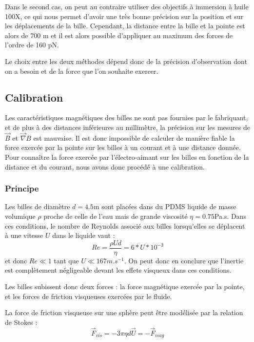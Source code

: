 		 Dans le second cas, on peut au contraire utiliser des objectifs à immersion à huile 100X, ce qui nous permet d'avoir une très bonne précision sur la position et sur les déplacements de la bille. Cependant, la distance entre la bille et la pointe est alors de 700 \micro m et il est alors possible d'appliquer au maximum des forces de l'ordre de 160 pN. 
		 
Le choix entre les deux méthodes dépend donc de la précision d'observation dont on a besoin et de la force que l'on souhaite exercer. 

		 
		 
		 		 
		  
		
		
	\subsection{Calibration}
  
 Les caractéristiques magnétiques des billes ne sont pas fournies par le fabriquant, et de plus à des distances inférieures au millimètre, la précision sur les mesures de $\vec{B}$ et $\vec{\nabla}B$ est mauvaise. 
 Il est donc impossible de calculer de manière fiable la force exercée par la pointe sur les billes à un courant et à une distance donnée.
 Pour connaître la force exercée par l'électro-aimant sur les billes en fonction de la distance et du courant, nous avons donc procédé à une calibration.
 
 \subsubsection{Principe}
 
 Les billes de diamètre $d=4.5$\micro m sont placées dans du PDMS liquide de masse volumique $\rho$ proche de celle de l'eau mais de grande viscosité $\eta=0.75$Pa.s. 
 Dans ces conditions, le nombre de Reynolds associé aux billes lorsqu'elles se déplacent à une vitesse $U$ dans le liquide vaut : $$Re = \frac{\rho U d }{\eta}=6*U*10^{-3}$$
 et donc $Re \ll 1$ tant que  $U \ll 167 m.s^{-1}$. 
 On peut donc en conclure que l'inertie est complètement négligeable devant les effets visqueux dans ces conditions. 
 
 Les billes subissent donc deux forces : la force magnétique exercée par la pointe, et les forces de friction visqueuses exercées par le fluide. 
 
 La force de friction visqueuse sur une sphère peut être modélisée par la relation de Stokes : 
 $$ \vec{F}_{vis}=- 3 \pi \eta d \vec{U} =-\vec{F}_{mag}$$
 
